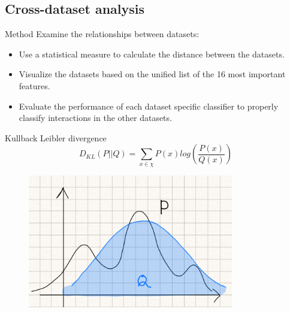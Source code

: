 \documentclass{beamer}
\begin{document}
\subsection{Cross-dataset analysis}
\begin{frame}{Method}
Examine the relationships between datasets:
\begin{itemize}
\item Use a statistical measure to calculate the distance between the datasets. 
\item Visualize the datasets based on the unified list of the 16 most important features.
\item Evaluate the performance of each dataset specific classifier to properly classify interactions in the other datasets.
\end{itemize}
\end{frame}

\begin{frame}{Kullback Leibler divergence}
\begin{equation*}
 D_{KL} \left (P ||Q \right ) = \sum_{x\in \chi }{P\left ( x \right )log\left ( \frac{P\left ( x \right )}{Q\left ( x \right )} \right )}\label{eq:1}
\end{equation*}

   \begin{figure}[h!]
    \centering
      \includegraphics[width=0.8\textwidth]{images/kl_explain.png}
      \end{figure}

\end{frame}
\end{document}
